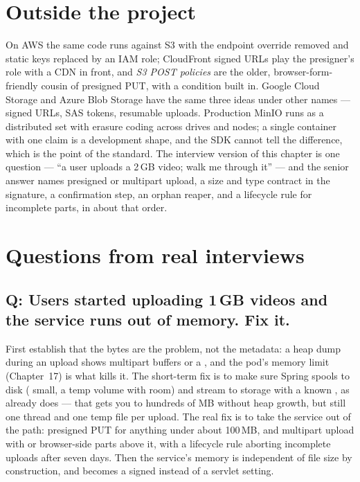 \section{Outside the project}

On AWS the same code runs against S3 with the endpoint override removed
and static keys replaced by an IAM role; CloudFront signed URLs play the
presigner's role with a CDN in front, and \emph{S3 POST policies} are the
older, browser-form-friendly cousin of presigned PUT, with a
 condition built in. Google Cloud Storage and
Azure Blob Storage have the same three ideas under other names ---
signed URLs, SAS tokens, resumable uploads. Production MinIO runs as a
distributed set with erasure coding across drives and nodes; a single
container with one claim is a development shape, and the SDK cannot tell
the difference, which is the point of the standard. The interview
version of this chapter is one question --- ``a user uploads a 2\,GB
video; walk me through it'' --- and the senior answer names presigned or
multipart upload, a size and type contract in the signature, a
confirmation step, an orphan reaper, and a lifecycle rule for
incomplete parts, in about that order.

\section{Questions from real interviews}

\subsection*{Q: Users started uploading 1\,GB videos and the service runs out of memory. Fix it.}

First establish that the bytes are the problem, not the metadata: a heap
dump during an upload shows multipart buffers or a
, and the pod's memory limit
(Chapter~17) is what kills it. The short-term fix is to make sure Spring
spools to disk ( small, a temp volume with room)
and stream to storage with a known , as
 already does --- that gets you to
hundreds of MB without heap growth, but still one thread and one
temp file per upload. The real fix is to take the service out of the
path: presigned PUT for anything under about 100\,MB, and multipart
upload with  or browser-side parts above it,
with a lifecycle rule aborting incomplete uploads after seven days. Then
the service's memory is independent of file size by construction, and
 becomes a signed  instead of
a servlet setting.

